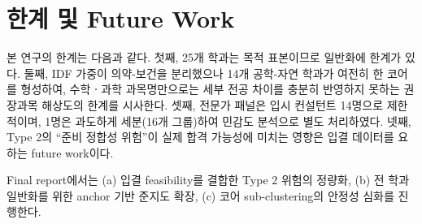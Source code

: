 \documentclass[conference]{IEEEtran}
\begin{document}
\section{한계 및 Future Work}

본 연구의 한계는 다음과 같다.
첫째, 25개 학과는 목적 표본이므로 일반화에 한계가 있다.
둘째, IDF 가중이 의약-보건을 분리했으나 14개 공학-자연 학과가 여전히 한 코어를 형성하여, 수학ㆍ과학 과목명만으로는 세부 전공 차이를 충분히 반영하지 못하는 권장과목 해상도의 한계를 시사한다.
셋째, 전문가 패널은 입시 컨설턴트 14명으로 제한적이며, 1명은 과도하게 세분(16개 그룹)하여 민감도 분석으로 별도 처리하였다.
넷째, Type 2의 ``준비 정합성 위험''이 실제 합격 가능성에 미치는 영향은 입결 데이터를 요하는 future work이다.

Final report에서는 (a) 입결 feasibility를 결합한 Type 2 위험의 정량화, (b) 전 학과 일반화를 위한 anchor 기반 준지도 확장, (c) 코어 sub-clustering의 안정성 심화를 진행한다.
\end{document}
